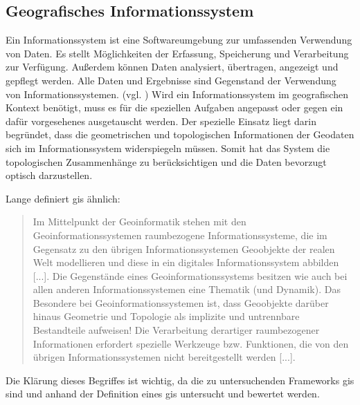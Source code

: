 \subsection{Geografisches Informationssystem}
\label{grundlagen:gis}
Ein Informationssystem ist eine Softwareumgebung zur umfassenden Verwendung von Daten.
Es stellt Möglichkeiten der Erfassung, Speicherung und Verarbeitung zur Verfügung.
Außerdem können Daten analysiert, übertragen, angezeigt und gepflegt werden.
Alle Daten und Ergebnisse sind Gegenstand der Verwendung von Informationssystemen. (vgl. \cite[S.32]{book:kudrass})
Wird ein Informationssystem im geografischen Kontext benötigt, muss es für die speziellen Aufgaben angepasst oder gegen ein dafür vorgesehenes ausgetauscht werden.
Der spezielle Einsatz liegt darin begründet, dass die geometrischen und topologischen Informationen der Geodaten sich im Informationssystem widerspiegeln müssen.
Somit hat das System die topologischen Zusammenhänge zu berücksichtigen und die Daten bevorzugt optisch darzustellen.

Lange definiert \Gls{gis} ähnlich:
\begin{quote}
Im Mittelpunkt  der  Geoinformatik  stehen  mit den  Geoinformationssystemen raumbezogene Informationssysteme, die im Gegensatz zu den übrigen Informationssystemen Geoobjekte  der realen Welt modellieren und diese in ein digitales Informationssystem abbilden [...]. Die Gegenstände eines Geoinformationssystems  besitzen  wie  auch  bei  allen  anderen  Informationssystemen  eine 
Thematik (und Dynamik). Das Besondere bei Geoinformationssystemen ist, dass Geoobjekte darüber hinaus Geometrie und Topologie als implizite und untrennbare Bestandteile aufweisen!  Die Verarbeitung derartiger raumbezogener Informationen erfordert spezielle Werkzeuge bzw. Funktionen, die von den übrigen Informationssystemen nicht bereitgestellt werden [...]. \cite[S.337]{book:gi-theopluspraxis3}
\end{quote}
Die Klärung dieses Begriffes ist wichtig, da die zu untersuchenden Frameworks \Gls{gis} sind und anhand der Definition eines \Gls{gis} untersucht und bewertet werden.


